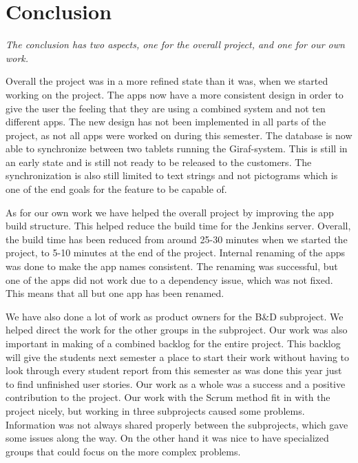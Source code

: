\chapter{Conclusion} \label{ChapConclusion}
\textit{The conclusion has two aspects, one for the overall project, and one for our own work.}

Overall the project was in a more refined state than it was, when we started working on the project.
The apps now have a more consistent design in order to give the user the feeling that they are using a combined system and not ten different apps. The new design has not been implemented in all parts of the project, as not all apps were worked on during this semester.
The database is now able to synchronize between two tablets running the Giraf-system. This is still in an early state and is still not ready to be released to the customers. The synchronization is also still limited to text strings and not pictograms which is one of the end goals for the feature to be capable of.

As for our own work we have helped the overall project by improving the app build structure. This helped reduce the build time for the Jenkins server. Overall, the build time has been reduced from around 25-30 minutes when we started the project, to 5-10 minutes at the end of the project.
Internal renaming of the apps was done to make the app names consistent. The renaming was successful, but one of the apps did not work due to a dependency issue, which was not fixed. This means that all but one app has been renamed.

We have also done a lot of work as product owners for the B\&D subproject. We helped direct the work for the other groups in the subproject. Our work was also important in making of a combined backlog for the entire project. This backlog will give the students next semester a place to start their work without having to look through every student report from this semester as was done this year just to find unfinished user stories.
Our work as a whole was a success and a positive contribution to the project. Our work with the Scrum method fit in with the project nicely, but working in three subprojects caused some problems. Information was not always shared properly between the subprojects, which gave some issues along the way. On the other hand it was nice to have specialized groups that could focus on the more complex problems.